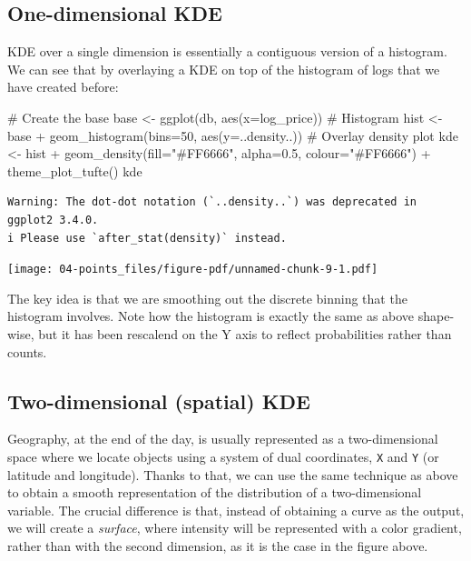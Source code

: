 \documentclass[
  letterpaper,
  DIV=11,
  numbers=noendperiod,
  oneside]{scrreprt}
\newenvironment{Shaded}{\begin{snugshade}}{\end{snugshade}}
\newcommand{\AttributeTok}[1]{\textcolor[rgb]{0.40,0.45,0.13}{#1}}
\newcommand{\CommentTok}[1]{\textcolor[rgb]{0.37,0.37,0.37}{#1}}
\newcommand{\DecValTok}[1]{\textcolor[rgb]{0.68,0.00,0.00}{#1}}
\newcommand{\FloatTok}[1]{\textcolor[rgb]{0.68,0.00,0.00}{#1}}
\newcommand{\FunctionTok}[1]{\textcolor[rgb]{0.28,0.35,0.67}{#1}}
\newcommand{\NormalTok}[1]{\textcolor[rgb]{0.00,0.23,0.31}{#1}}
\newcommand{\OtherTok}[1]{\textcolor[rgb]{0.00,0.23,0.31}{#1}}
\newcommand{\SpecialCharTok}[1]{\textcolor[rgb]{0.37,0.37,0.37}{#1}}
\newcommand{\StringTok}[1]{\textcolor[rgb]{0.13,0.47,0.30}{#1}}
\begin{document}
\subsection{One-dimensional KDE}\label{one-dimensional-kde}

KDE over a single dimension is essentially a contiguous version of a
histogram. We can see that by overlaying a KDE on top of the histogram
of logs that we have created before:

\begin{Shaded}
\begin{Highlighting}[]
\CommentTok{\# Create the base}
\NormalTok{base }\OtherTok{\textless{}{-}} \FunctionTok{ggplot}\NormalTok{(db, }\FunctionTok{aes}\NormalTok{(}\AttributeTok{x=}\NormalTok{log\_price))}
\CommentTok{\# Histogram}
\NormalTok{hist }\OtherTok{\textless{}{-}}\NormalTok{ base }\SpecialCharTok{+} 
  \FunctionTok{geom\_histogram}\NormalTok{(}\AttributeTok{bins=}\DecValTok{50}\NormalTok{, }\FunctionTok{aes}\NormalTok{(}\AttributeTok{y=}\NormalTok{..density..))}
\CommentTok{\# Overlay density plot}
\NormalTok{kde }\OtherTok{\textless{}{-}}\NormalTok{ hist }\SpecialCharTok{+} 
  \FunctionTok{geom\_density}\NormalTok{(}\AttributeTok{fill=}\StringTok{"\#FF6666"}\NormalTok{, }\AttributeTok{alpha=}\FloatTok{0.5}\NormalTok{, }\AttributeTok{colour=}\StringTok{"\#FF6666"}\NormalTok{) }\SpecialCharTok{+}
  \FunctionTok{theme\_plot\_tufte}\NormalTok{()}
\NormalTok{kde}
\end{Highlighting}
\end{Shaded}

\begin{verbatim}
Warning: The dot-dot notation (`..density..`) was deprecated in ggplot2 3.4.0.
i Please use `after_stat(density)` instead.
\end{verbatim}

\texttt{[image: 04-points\_files/figure-pdf/unnamed-chunk-9-1.pdf]}

The key idea is that we are smoothing out the discrete binning that the
histogram involves. Note how the histogram is exactly the same as above
shape-wise, but it has been rescalend on the Y axis to reflect
probabilities rather than counts.

\subsection{Two-dimensional (spatial)
KDE}\label{two-dimensional-spatial-kde}

Geography, at the end of the day, is usually represented as a
two-dimensional space where we locate objects using a system of dual
coordinates, \texttt{X} and \texttt{Y} (or latitude and longitude).
Thanks to that, we can use the same technique as above to obtain a
smooth representation of the distribution of a two-dimensional variable.
The crucial difference is that, instead of obtaining a curve as the
output, we will create a \emph{surface}, where intensity will be
represented with a color gradient, rather than with the second
dimension, as it is the case in the figure above.
\end{document}
